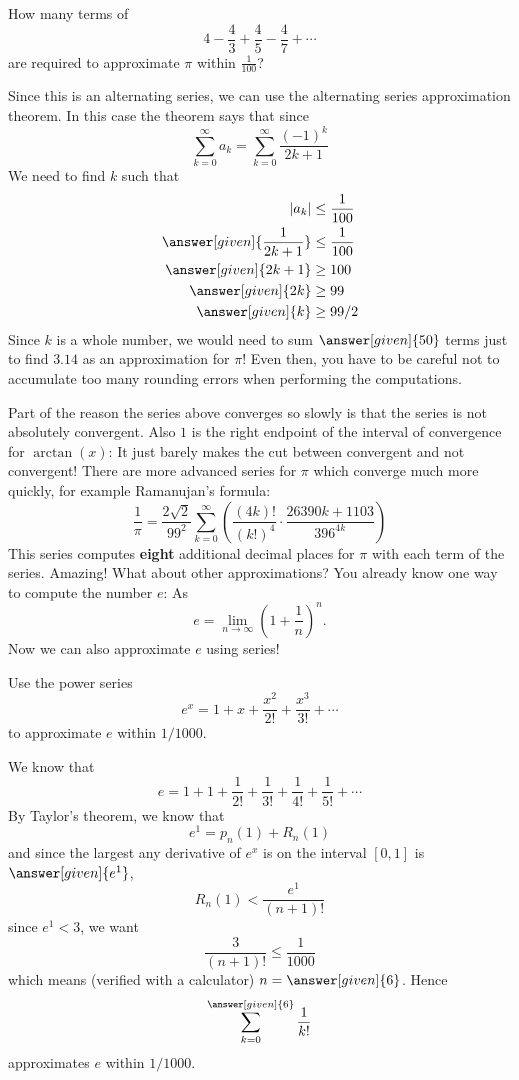 \documentclass{ximera}
\begin{document}
\begin{example}
  How many terms of
  \[
  4-\frac{4}{3}+\frac{4}{5}-\frac{4}{7}+\cdots
  \]
  are required to approximate $\pi$ within $\frac{1}{100}$?
  \begin{explanation}
    Since this is an alternating series, we can use the alternating
    series approximation theorem. In this case the theorem says that
    since
    \[
    \sum_{k=0}^\infty a_k = \sum_{k=0}^\infty \frac{(-1)^k}{2k+1}
    \]
    We need to find $k$ such that
    \begin{align*}
      |a_k| &\le \frac{1}{100}\\
      \answer[given]{\frac{1}{2k+1}} &\le \frac{1}{100}\\
      \answer[given]{2k+1} &\ge 100\\
      \answer[given]{2k} &\ge 99\\
      \answer[given]{k} &\ge 99/2
    \end{align*}
    Since $k$ is a whole number, we would need to sum $\answer[given]{50}$ terms just
    to find $3.14$ as an approximation for $\pi$! Even then, you have
    to be careful not to accumulate too many rounding errors when
    performing the computations.
  \end{explanation}
\end{example}


Part of the reason the series above converges so slowly is that the
series is not absolutely convergent.  Also $1$ is the right endpoint
of the interval of convergence for $\arctan(x)$: It just barely makes
the cut between convergent and not convergent! There are more advanced
series for $\pi$ which converge much more quickly, for example
Ramanujan's formula:
\[
\frac{1}{\pi} = \frac{2 \sqrt 2}{99^2} \sum_{k=0}^\infty \left(\frac{(4k)!}{(k!)^4} \cdot \frac{26390k+1103}{396^{4k}}\right)
\]
This series computes \textbf{eight} additional decimal places for
$\pi$ with each term of the series. Amazing! What about other
approximations?  You already know one way to compute the number $e$:
As
\[
e = \lim_{n\to \infty} \left( 1+\frac{1}{n}\right)^n.
\]
Now we can also approximate $e$ using series!

\begin{example}
  Use the power series 
  \[
  e^x = 1+x+\frac{x^2}{2!}+\frac{x^3}{3!}+\cdots
  \]
  to approximate $e$ within $1/1000$.
  \begin{explanation}
    We know that
	\[
	e = 1+1+\frac{1}{2!}+\frac{1}{3!}+\frac{1}{4!}+\frac{1}{5!}+\cdots
	\]
        By Taylor's theorem, we know that
        \[
        e^1 = p_n(1) + R_n(1)
        \]
        and since the largest any derivative of $e^x$ is on the
        interval $[0,1]$ is $\answer[given]{e^1}$,
        \[
        R_n(1) < \frac{e^1}{(n+1)!} 
        \]
        since $e^1<3$, we want
        \[
        \frac{3}{(n+1)!} \le \frac{1}{1000}
        \]
        which means (verified with a calculator) $n=\answer[given]{6}$. Hence
        \[
        \sum_{k=0}^{\answer[given]{6}}\frac{1}{k!}
        \]
        approximates $e$ within $1/1000$.
  \end{explanation}
\end{example}
\end{document}
